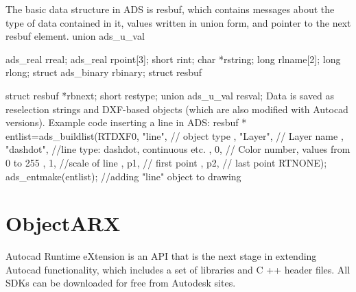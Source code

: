 \documentclass[a4paper, 11pt, article]{report}
\begin{document}
The basic data structure in ADS is resbuf, which contains messages about the type of data contained in it, values written in union form, and pointer to the next resbuf element.
\newline
\newline
[code language="cpp"] union ads_u_val { \newline
ads_real rreal; \newline
ads_real rpoint[3]; \newline
short rint; \newline
char *rstring; \newline
long rlname[2]; \newline
long rlong; \newline
struct ads_binary rbinary; \newline
struct resbuf { struct resbuf *rbnext; \newline
short restype; \newline
union ads_u_val resval;\newline
[/code] \newline
 \newline
 Data is saved as reselection strings and DXF-based objects (which are also modified with Autocad versions).
 \newline
 Example code inserting a line in ADS:
 \newline
 \newline
 [code language="cpp"] resbuf * entlist=ads_buildlist(RTDXF0, "line", // object type , "Layer", // Layer name , "dashdot", //line type: dashdot, continuous etc. , 0, // Color number, values from 0 to 255 , 1, //scale of line , p1, // first point , p2, // last point \newline
RTNONE); \newline
ads_entmake(entlist); //adding "line" object to drawing \newline
[/code] \newline
\newline
 
 \section{ObjectARX}
 Autocad Runtime eXtension is an API that is the next stage in extending Autocad functionality, which includes a set of libraries and C ++ header files. All SDKs can be downloaded for free from Autodesk sites.

}}
\end{document}
